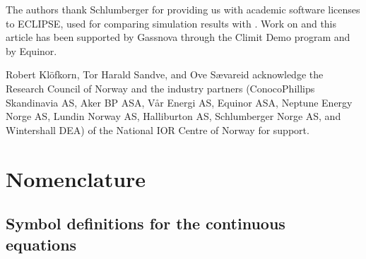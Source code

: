 The authors thank Schlumberger for providing us with academic software licenses to
ECLIPSE, used for comparing simulation results with \opmflow.  Work on \opmflow and this
article has been supported by Gassnova through the Climit Demo program and by Equinor.

Robert Kl{\"o}fkorn, Tor Harald Sandve, and Ove S{\ae}vareid acknowledge the Research
Council of Norway and the industry partners (ConocoPhillips Skandinavia AS, Aker BP ASA,
V{\aa}r Energi AS, Equinor ASA, Neptune Energy Norge AS, Lundin Norway AS, Halliburton AS,
Schlumberger Norge AS, and Wintershall DEA) of the National IOR Centre of Norway for
support.







\appendix


\section{Nomenclature}
\label{appendix:nomenclature}

\subsection{Symbol definitions for the continuous equations}
\label{appendix:nomenclature:cont}

